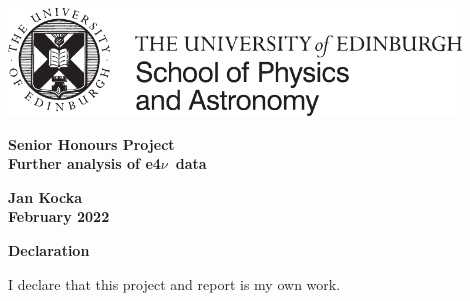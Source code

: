 \documentclass[a4paper,12pt]{article}
\newcommand{\efn}{e4$\nu$}
\begin{document}
\pagestyle{empty}
\par\noindent\includegraphics[width=12cm]{PandA_crest.pdf}
\par\noindent

\vspace*{2cm}

\begin{center}
        \Large\bf \Large\bf Senior Honours Project \\
        \LARGE\bf Further analysis of \efn\ data
\end{center}

\vspace*{0.5cm}

\begin{center}
        \bf Jan Kocka \\
        February 2022
\end{center}
\vspace*{5mm}

\begin{abstract}
    \noindent
    This report outlines the need for a better understanding of neutrino-nucleus interactions and how studying electron-nucleus interaction can be just as illuminating as working directly with neutrinos.
    It covers some of the prerequisites to understand such studies, including the most commonly studied interaction types and the use of Monte Carlo event generators like GENIE.
    An introduction to the CLAS6 data used by the \efn\ collaboration is presented and a new codebase using modern C\texttt{++} to analyse the data was developed.
    Finally we use this code to conduct a study of nuclear effects on the reconstruction of pion momentum of 1 pion 1 nucleon events (mainly from $\Delta_{1232}$ resonances) from GENIE generated 2.26\si{GeV} incident electron - carbon nucleus scattering.
    We identify errors of the reconstruction due to initial state effects and final state interactions, however even once adjusting for detector precision reconstructing pion momentum should be possible within 400 \si{Mev/c}.
\end{abstract}

\vspace*{1cm}

\begin{center}
    \textbf{\normalsize Declaration}

      I declare that this project and report is my own work.
\end{center}
\end{document}
